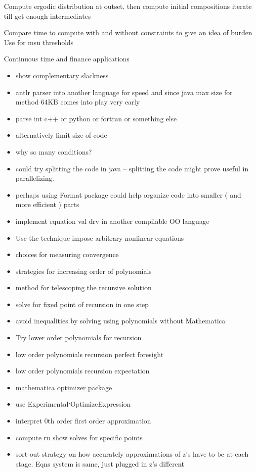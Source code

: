 \documentclass[12pt]{article}
\begin{document}
Compute ergodic distribution at outset, then compute initial compositions iterate till get enough intermediates

Compare time to compute with and without constraints to give an idea of burden Use for msu thresholds

Continuous time and finance applications

\begin{itemize}
\item show complementary slackness
\item antlr parser into another language for speed and since java max size for method 64KB comes into play very early
\item parse int c++ or python or fortran or something else
\item alternatively limit size of code
\item why so many conditions?
\item could try splitting the code in java  -- splitting the code might prove useful in parallelizing.
\item perhaps using Format  package could help organize code into
smaller ( and more efficient ) parts
\item implement equation val drv in another compilable OO language
\item Use the technique impose arbitrary nonlinear equations
\item choices for measuring convergence
\item strategies for increasing order of polynomials
\item method for telescoping the recursive solution
\item solve for fixed point of recursion in one step
\item avoid inequalities by solving using polynomials without Mathematica
\item Try lower order polynomials for recursion
\item low order polynomials recursion perfect foresight
\item low order polynomials recursion expectation
\item \href{http://library.wolfram.com/infocenter/Conferences/5398/MOandMOPTalk.pdf}{mathematica optimizer  package}
\item use Experimental`OptimizeExpression
\item interpret 0th order first order approximation
\item compute ru show solves for specific points
\item sort out strategy on how accurately approximations of z's have to be at each stage.  Eqns system is same, just plugged in z's different

\end{itemize}
\end{document}
